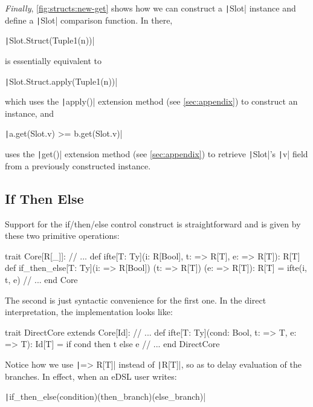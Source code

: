 \documentclass[11pt]{article}
\newcommand{\ScalaI}[1]{\texttt|#1|}
\newcommand{\FirstEtcX}[1]{\marginpar{\faCube{ \smaller #1}}\xspace}
\newcommand{\FirstEtc}{\FirstEtcX{}}
\begin{document}
\textit{Finally}\FirstEtc, \autoref{fig:structs:new-get} shows how we can construct a \ScalaI{Slot} instance and define a \ScalaI{Slot} comparison function. In there,

\ScalaI{Slot.Struct(Tuple1(n))}

\noindent is essentially equivalent to

\ScalaI{Slot.Struct.apply(Tuple1(n))}


\noindent which uses the \ScalaI{apply()} extension method (see \autoref{sec:appendix}) to construct an instance, and

\ScalaI{a.get(Slot.v) >= b.get(Slot.v)}

\noindent uses the \ScalaI{get()} extension method (see \autoref{sec:appendix}) to retrieve \ScalaI{Slot}'s \ScalaI{v} field from a previously constructed instance.


\subsection{If Then Else}
\label{sec:ifthenelse}

Support for the if/then/else control construct is straightforward and is given by these two primitive operations:

\begin{ScalaBlockSimple}
trait Core[R[_]]:
  // ...
  def ifte[T: Ty](i: R[Bool], t: => R[T], e: => R[T]): R[T]
  def if_then_else[T: Ty](i: => R[Bool])
                         (t: => R[T])
                         (e: => R[T]): R[T] = ifte(i, t, e)
  // ...
end Core
\end{ScalaBlockSimple}

\noindent The second is just syntactic convenience for the first one. In the direct interpretation, the implementation looks like:

\begin{ScalaBlockSimple}
trait DirectCore extends Core[Id]:
  // ...
  def ifte[T: Ty](cond: Bool, t: => T, e: => T): Id[T] =
    if cond then t else e
  // ...
end DirectCore
\end{ScalaBlockSimple}

Notice how we use \ScalaI{=> R[T]} instead of \ScalaI{R[T]}, so as to delay evaluation of the branches. In effect, when an eDSL user writes:

\ScalaI{if_then_else(condition)(then_branch)(else_branch)}
\end{document}
